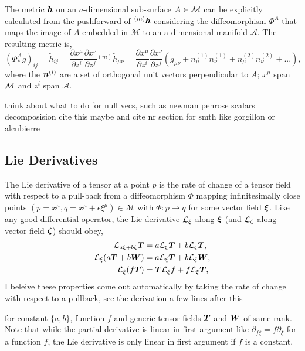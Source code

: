 The metric $\tilde{\boldsymbol{h}}$ on an $a$-dimensional sub-surface $A\in\mathcal{M}$ can be explicitly calculated from the pushforward of ${}^{(m)}\tilde{\boldsymbol{h}}$ considering the diffeomorphism $\Phi^A$ that maps the image of $A$ embedded in $\mathcal{M}$ to an a-dimensional manifold $\mathcal{A}$. The resulting metric is, 
\begin{equation}
(\Phi^A_* g)_{ij} = \tilde{h}_{ij} = \frac{\partial x^\mu}{\partial z^i} \frac{\partial x^\nu}{\partial z^j} {}^{(m)}\tilde{h}_{\mu\nu}  = \frac{\partial x^\mu}{\partial z^i} \frac{\partial x^\nu}{\partial z^j}\left( g_{\mu\nu}\mp n^{(1)}_\mu n^{(1)}_\nu  \mp n^{(2)}_\mu n^{(2)}_\nu + ...  \right), \label{intro:eq:projectedmetric}
\end{equation}
where the $\boldsymbol{n}^{(i)}$ are a set of orthogonal unit vectors perpendicular to $A$; $x^\mu$ span $\mathcal{M}$ and $z^i$ span $\mathcal{A}$.

\color{gren} think about what to do for null vecs, such as newman penrose scalars decomposision \color{black}
\color{gren} cite this maybe and cite nr section for smth like gorgillon or alcubierre \color{black}

\subsection{Lie Derivatives}\label{intro:sec:lie_deriv}

The Lie derivative of a tensor at a point $p$ is the rate of change of a tensor field with respect to a pull-back from a diffeomorphism $\Phi$ mapping infinitesimally close points $(p=x^\mu,q= x^\mu+\epsilon \xi^\mu) \in \mathcal{M}$ with $\Phi:p \rightarrow q $ for some vector field $\boldsymbol{\xi}$. Like any good differential operator, the Lie derivative $\mathcal{L}_\xi$ along $\boldsymbol{\xi}$ (and $\mathcal{L}_\zeta$ along vector field $\boldsymbol{\zeta}$) should obey,
\begin{align}
\mathcal{L}_{a \xi + b \zeta}\boldsymbol{T}  &= a \mathcal{L}_\xi\boldsymbol{T}  + b \mathcal{L}_\zeta\boldsymbol{T} ,\\
\mathcal{L}_\xi (a \boldsymbol{T} + b \boldsymbol{W}) & = a \mathcal{L}_\xi \boldsymbol{T} + b \mathcal{L}_\xi \boldsymbol{W} , \\
\mathcal{L}_\xi (f \boldsymbol{T} ) &= \boldsymbol{T} \mathcal{L}_\xi f + f \mathcal{L}_\xi \boldsymbol{T} \label{intro:eq:lie_liebnitz},
\end{align}
\color{choral} I beleive these properties come out automatically by taking the rate of change with respect to a pullback, see the derivation a few lines after this \color{black}

for constant $\{a,b\}$, function $f$ and generic tensor fields $\boldsymbol{T}$ and $\boldsymbol{W}$ of same rank. Note that while the partial derivative is linear in first argument like $\partial_{f \xi} = f \partial_\xi$ for a function $f$, the Lie derivative is only linear in first argument if $f$ is a constant.

